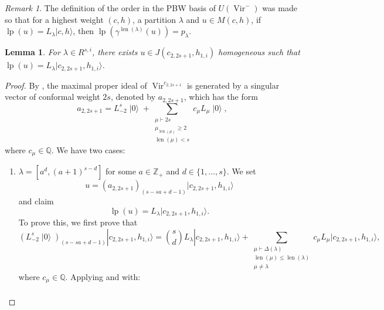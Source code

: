 \documentclass[a4paper, 12pt, reqno]{amsart}
\newtheorem{lemma}[theorem]{Lemma}
\theoremstyle{remark}
\newtheorem{remark}[theorem]{Remark}
\DeclareMathOperator{\Vir}{Vir}
\DeclareMathOperator{\len}{len}
\DeclareMathOperator{\vac}{|0\rangle}
\DeclareMathOperator{\lp}{lp}
\begin{document}
\begin{remark}
  \label{rmk:4}
  The definition of the order in the PBW basis of $U(\Vir^-)$ was made so that for a highest weight $(c, h)$, a partition $\lambda$ and $u \in M(c, h)$, if $\lp(u) = L_{\lambda}|c, h\rangle$, then $\lp(\gamma^{\len(\lambda)}(u)) = p_{\lambda}$.
\end{remark}

\begin{lemma}
  \label{lmm:10}
  For $\lambda \in R^{s, i}$, there exists $u \in J(c_{2, 2s + 1}, h_{1, i})$ homogeneous such that $\lp(u) = L_{\lambda}|c_{2, 2s + 1}, h_{1, i}\rangle$.
\end{lemma}

\begin{proof}
  By , the maximal proper ideal of $\Vir^{c_{2, 2s + 1}}$ is generated by a singular vector of conformal weight $2s$, denoted by $a_{2, 2s + 1}$, which has the form
  \begin{equation}
    \label{eq:5}
    a_{2, 2s + 1} = L_{-2}^s\vac + \sum_{\substack{\mu \vdash 2s \\ \mu_{\len(\mu)} \ge 2 \\ \len(\mu) < s}}c_{\mu}L_{\mu}\vac,
  \end{equation}
  where $c_{\mu} \in \mathbb{Q}$.
  We have two cases:
  \begin{enumerate}
  \item $\lambda = [a^d, (a + 1)^{s - d}]$ for some $a \in \mathbb{Z}_+$ and $d \in \{1, \dots, s\}$.
    We set
    \begin{equation*}
      u = (a_{2, 2s + 1})_{(s - sa + d - 1)}|c_{2, 2s + 1}, h_{1, i}\rangle
    \end{equation*}
    and claim
    \begin{equation*}
      \lp(u) = L_{\lambda}|c_{2, 2s + 1}, h_{1, i}\rangle.
    \end{equation*}
    To prove this, we first prove that
    \begin{equation}
      \label{eq:6}
      (L_{-2}^s\vac)_{(s - sa + d - 1)}|c_{2, 2s + 1}, h_{1, i}\rangle = \binom{s}{d}L_{\lambda}|c_{2, 2s + 1}, h_{1, i}\rangle + \sum_{\substack{\mu \vdash \Delta(\lambda) \\ \len(\mu) \le \len(\lambda) \\ \mu \neq \lambda}}c_{\mu}L_{\mu}|c_{2, 2s + 1}, h_{1, i}\rangle,
    \end{equation}
    where $c_{\mu} \in \mathbb{Q}$.
    Applying  and  with:
    \begin{align*}

\end{align*}
\end{enumerate}
\end{proof}
\end{document}
